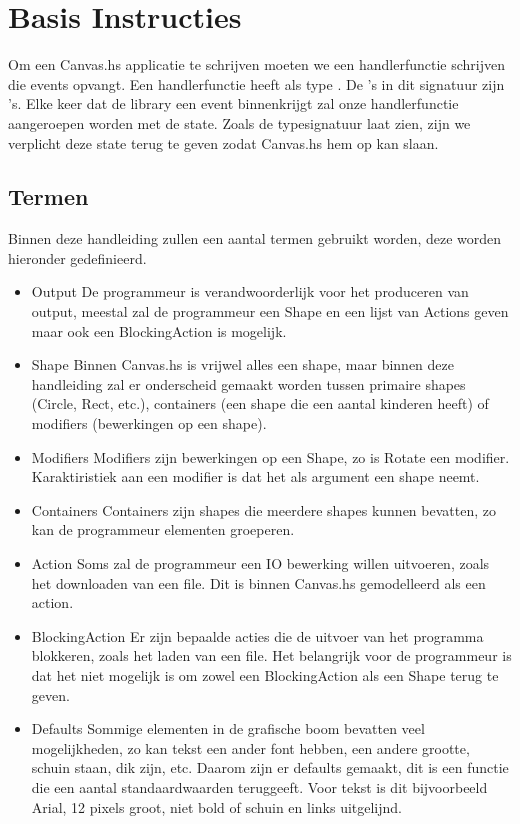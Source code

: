 \section{Basis Instructies}

Om een Canvas.hs applicatie te schrijven moeten we een handlerfunctie schrijven die events opvangt. Een handlerfunctie heeft als type . De 's in dit signatuur zijn 's. Elke keer dat de library een event binnenkrijgt zal onze handlerfunctie aangeroepen worden met de state. Zoals de typesignatuur laat zien, zijn we verplicht deze state terug te geven zodat Canvas.hs hem op kan slaan.

\subsection{Termen}
Binnen deze handleiding zullen een aantal termen gebruikt worden, deze worden hieronder gedefinieerd.
\begin{itemize}
	\item Output
De programmeur is verandwoorderlijk voor het produceren van output, meestal zal de programmeur een Shape en een lijst van Actions geven maar ook een BlockingAction is mogelijk.
	\item Shape
Binnen Canvas.hs is vrijwel alles een shape, maar binnen deze handleiding zal er onderscheid gemaakt worden tussen primaire shapes (Circle, Rect, etc.), containers (een shape die een aantal kinderen heeft) of modifiers (bewerkingen op een shape).
	\item Modifiers
Modifiers zijn bewerkingen op een Shape, zo is Rotate een modifier. Karaktiristiek aan een modifier is dat het als argument een shape neemt.
	\item Containers
Containers zijn shapes die meerdere shapes kunnen bevatten, zo kan de programmeur elementen groeperen.
	\item Action
Soms zal de programmeur een IO bewerking willen uitvoeren, zoals het downloaden van een file. Dit is binnen Canvas.hs gemodelleerd als een action.
	\item BlockingAction
Er zijn bepaalde acties die de uitvoer van het programma blokkeren, zoals het laden van een file. Het belangrijk voor de programmeur is dat het niet mogelijk is om zowel een BlockingAction als een Shape terug te geven. 
    \item Defaults
Sommige elementen in de grafische boom bevatten veel mogelijkheden, zo kan tekst een ander font hebben, een andere grootte, schuin staan, dik zijn, etc. Daarom zijn er defaults gemaakt, dit is een functie die een aantal standaardwaarden teruggeeft. Voor tekst is dit bijvoorbeeld Arial, 12 pixels groot, niet bold of schuin en links uitgelijnd.
\end{itemize}

